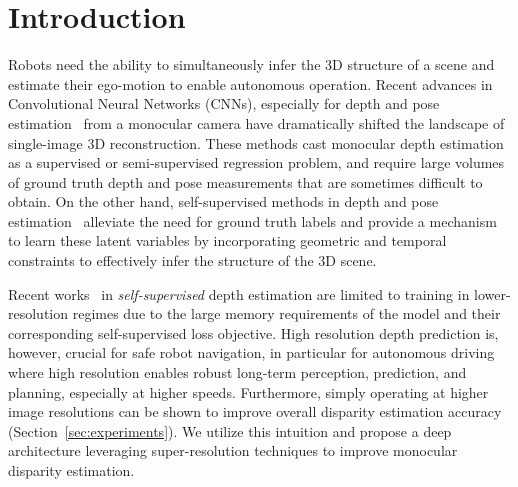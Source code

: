 \documentclass[letterpaper, 10 pt, conference]{ieeeconf}  \IEEEoverridecommandlockouts
\begin{document}
\section{Introduction}
\label{sec-introduction}
Robots need the ability to simultaneously infer the 3D structure of a scene and estimate their ego-motion to enable autonomous operation. Recent advances in Convolutional Neural Networks (CNNs), especially for depth and pose estimation~\cite{ummenhofer2017demon,wang2018learning,kuznietsov2017semi,eigen2014depth} from a monocular camera have dramatically shifted the landscape of single-image 3D reconstruction. These methods cast monocular depth estimation as a supervised or semi-supervised regression problem, and require large volumes of ground truth depth and pose measurements that are sometimes difficult to obtain. On the other hand, self-supervised methods in depth and pose estimation~\cite{garg2016unsupervised,godard2017unsupervised,zhou2017unsupervised} alleviate the need for ground truth labels and provide a mechanism to learn these latent variables by incorporating geometric and temporal constraints to effectively infer the structure of the 3D scene. 















 
 Recent works~\cite{godard2017unsupervised,zhou2017unsupervised,godard2018digging} in \textit{self-supervised} depth estimation are limited to training in lower-resolution regimes due to the large memory requirements of the model and their corresponding self-supervised loss objective.
High resolution depth prediction is, however, crucial for safe robot navigation, in particular for autonomous driving where high resolution enables robust long-term perception, prediction, and planning, especially at higher speeds. 
Furthermore, simply operating at higher image resolutions can be shown to improve overall disparity estimation accuracy (Section~\ref{sec:experiments}).
We utilize this intuition and propose a deep architecture leveraging super-resolution techniques to improve monocular disparity estimation. 
 
\end{document}

